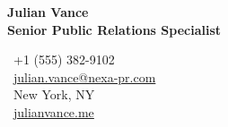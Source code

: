 \documentclass[10pt]{article}
\begin{document}
\pagestyle{empty}

\begin{tcolorbox}[
  colback=lightbg,
  colframe=primary,
  arc=4pt,
  boxrule=0pt,
  leftrule=4pt,
  top=8pt,
  bottom=8pt,
  left=10pt,
  right=10pt,
  boxsep=0pt,
  before=\vspace{0pt},
  after=\vspace{0pt}
]
  \begin{minipage}[c]{0.60\textwidth}
    {\Huge \bfseries \color{primary} Julian Vance} \\[0.05cm]
    {\large \bfseries \color{secondary} Senior Public Relations Specialist}
  \end{minipage}%
  \hfill%
  \begin{minipage}[c]{0.38\textwidth}
    \flushright \small \color{darktext}
    \faPhone\ +1 (555) 382-9102 \\
    \faEnvelope\ \href{mailto:julian.vance@nexa-pr.com}{julian.vance@nexa-pr.com} \\
    \faMapMarker\ New York, NY \\
    \faGlobe\ \href{https://julianvance.me}{julianvance.me}
  \end{minipage}
\end{tcolorbox}

\vspace{0.25cm}
\end{document}
